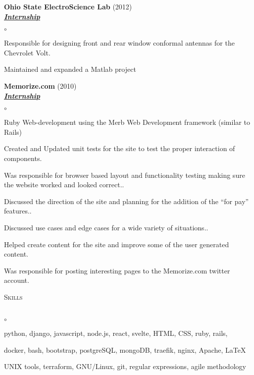 \documentclass{article}
\newcommand{\lineunder}{\vspace*{-8pt} \\ \hspace*{-18pt} \hrulefill{} \\}
\newcommand{\header}[1]{{\hspace*{-15pt}\vspace*{6pt} \textsc{#1}} \vspace*{-6pt} \lineunder}
\newcommand{\employer}[3]{{ \textbf{#1} (#2)\\ \underline{\textbf{\emph{#3}}}\\  }}
\newenvironment{achievements}{\begin{list}{$\circ$}{\topsep 0pt \itemsep -2pt}}{\vspace*{4pt}\end{list}}
\begin{document}
\employer{Ohio State ElectroScience Lab}{2012}{Internship}
	\begin{achievements}
	\item Responsible for designing front and rear window conformal antennas for the Chevrolet Volt.
	\item Maintained and expanded a Matlab project
	\end{achievements}

\employer{Memorize.com}{2010}{Internship}
	\begin{achievements}
	\item Ruby Web-development using the Merb Web Development framework
(similar to Rails)
	\item Created and Updated unit tests for the site to test the proper
interaction of components.
	\item Was responsible for browser based layout and functionality testing
making sure the website worked and looked correct..
	\item Discussed the direction of the site and planning
for the addition of the ``for pay'' features..
	\item Discussed use cases and edge cases for a wide variety of
situations..
	\item Helped create content for the site and improve some of the
	user generated content.
	\item Was responsible for posting interesting pages to the Memorize.com twitter
	account.
	\end{achievements}

\header{Skills}
\begin{achievements}
	\item python, django, javascript, node.js, react, svelte, HTML, CSS, ruby, rails,
	\item docker, bash, bootstrap, postgreSQL, mongoDB, traefik, nginx, Apache, \LaTeX{}
	\item UNIX tools, terraform, GNU/Linux, git, regular expressions, agile methodology
\end{achievements}
\end{document}
